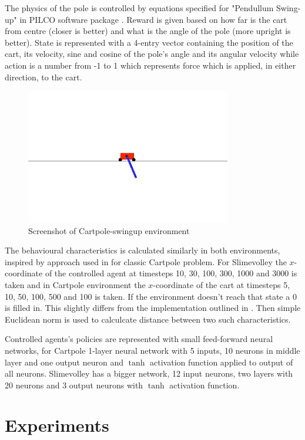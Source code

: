 The physics of the pole is controlled by equations specified for "Pendullum Swing-up" in PILCO software package \cite{pilco2013}. Reward is given based on how far is the cart from centre (closer is better) and what is the angle of the pole (more upright is better). State is represented with a 4-entry vector containing the position of the cart, its velocity, sine and cosine of the pole's angle and its angular velocity while action is a number from -1 to 1 which represents force which is applied, in either direction, to the cart.

\begin{figure}[h]
    \caption{Screenshot of Cartpole-swingup environment}
    \includegraphics[width=0.8\textwidth]{img/cartpole.png}
\end{figure}
% 
The behavioural characteristics is calculated similarly in both environments, inspired by approach used in \cite{Inden2013} for classic Cartpole problem. For Slimevolley the $x$-coordinate of the controlled agent at timesteps 10, 30, 100, 300, 1000 and 3000 is taken and in Cartpole environment the $x$-coordinate of the cart at timesteps 5, 10, 50, 100, 500 and 100 is taken. If the environment doesn't reach that state a 0 is filled in. This slightly differs from the implementation outlined in \cite{Inden2013}. Then simple Euclidean norm is used to calculcate distance between two such characteristics.

Controlled agents's policies are represented with small feed-forward neural networks, for Cartpole 1-layer neural network with 5 inputs, 10 neurons in middle layer and one output neuron and $\tanh$ activation function applied to output of all neurons. Slimevolley has a bigger network, 12 input neurons, two layers with 20 neurons and 3 output neurons with $\tanh$ activation function. 

\section{Experiments}

